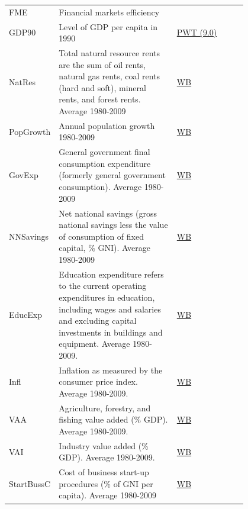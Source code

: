 \documentclass[a4paper,11pt]{article}
\begin{document}
\begin{center}
\begin{longtable}{l p{0.50\linewidth} p{0.3\linewidth}}
			FME & Financial markets efficiency & \href{http://data.imf.org/?sk=F8032E80-B36C-43B1-AC26-493C5B1CD33B}{\citet{svirydzenka2016introducing}} \\
			
			GDP90 & Level of GDP per capita in 1990 & \href{http://febpwt.webhosting.rug.nl/Home}{PWT (9.0)} \\
			
			NatRes & Total natural resource rents are the sum of oil rents, natural gas rents, coal rents (hard and soft), mineral rents, and forest rents. Average 1980-2009 & \href{http://data.worldbank.org/indicator/NY.GDP.TOTL.RT.ZS}{WB} \\
			
			PopGrowth & Annual population growth 1980-2009 & \href{http://data.worldbank.org/indicator/SP.POP.GROW}{WB} \\
			
			GovExp & General government final consumption expenditure (formerly general government consumption). Average 1980-2009 & \href{http://data.worldbank.org/indicator/NE.CON.GOVT.ZS}{WB}\\
			
			NNSavings & Net national savings (gross national savings less the value of consumption of fixed capital, \% GNI). Average 1980-2009 & \href{http://data.worldbank.org/indicator/NY.ADJ.NNAT.GN.ZS}{WB} \\
			
			EducExp & Education expenditure refers to the current operating expenditures in education, including wages and salaries and excluding capital investments in buildings and equipment. Average 1980-2009. & \href{http://data.worldbank.org/indicator/NY.ADJ.AEDU.GN.ZS}{WB} \\
			
			Infl & Inflation as measured by the consumer price index. Average 1980-2009. & \href{http://data.worldbank.org/indicator/FP.CPI.TOTL.ZG}{WB} \\
			
			VAA & Agriculture, forestry, and fishing value added (\% GDP). Average 1980-2009. & \href{http://data.worldbank.org/indicator/NV.AGR.TOTL.ZS}{WB} \\
			
			VAI & Industry value added (\% GDP). Average 1980-2009. & \href{http://data.worldbank.org/indicator/NV.IND.TOTL.ZS}{WB} \\
			
			StartBussC & Cost of business start-up procedures (\% of GNI per capita). Average 1980-2009 & \href{http://data.worldbank.org/indicator/IC.REG.COST.PC.ZS}{WB} \\
			

\end{longtable}
\end{center}
\end{document}
